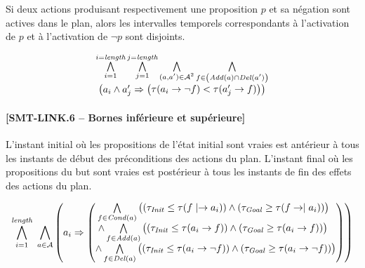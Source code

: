 Si deux actions produisant respectivement une proposition $p$ et sa négation sont actives dans le plan, alors les intervalles temporels correspondants à l’activation de $p$ et à l’activation de $\neg p$ sont disjoints.

\[
\begin{matrix}
\BigforallTwo{i=1}{i=\length} \BigforallTwo{j=1}{j=\length} \Bigforall{(\a,\b)\in\A^{2}} \Bigforall{\f\in\left(\Add{\a}\cap\Del{\b}\right)}\\ \left( \a_{i} \wedge \b_{j} \Rightarrow \left( \begin{matrix} \tau(\a_{i}\rightarrow\neg\f) < \tau(\b_{j}\rightarrow\f)%
\end{matrix} \right) \right)
\end{matrix}
\]

\paragraph*{[SMT-LINK.6 -- Bornes inférieure et supérieure]}

L’instant initial où les propositions de l’état initial sont vraies est antérieur à tous les instants de début des préconditions des actions du plan. L’instant final où les propositions du but sont vraies est postérieur à tous les instants de fin des effets des actions du plan.

\begin{small}
\[
\BigforallTwo{i=1}{\length}~\Bigforall{\substack{\a\in \A}}%
\left(\a_{i} \Rightarrow \begin{pmatrix}\Bigforall{\substack{\f\in \cond{\a}}} \begin{pmatrix}\left(\tau_{\mathit{Init}} \leq \tau(\f\mid\rightarrow\a_{i}) \right)%
 \wedge \left(\tau_{\mathit{Goal}} \geq \tau(\f\rightarrow\mid\a_{i})\right) \end{pmatrix}\hfill\\
 \wedge \Bigforall{\substack{\f\in \add{\a}}} \begin{pmatrix}\left(\tau_{\mathit{Init}} \leq \tau(\a_{i}\rightarrow \f) \right)%
 \wedge \left(\tau_{\mathit{Goal}} \geq \tau(\a_{i}\rightarrow \f)\right) \end{pmatrix}\hfill\\
 \wedge \Bigforall{\substack{\f\in \del{\a}}} \begin{pmatrix}\left(\tau_{\mathit{Init}} \leq \tau(\a_{i}\rightarrow \neg \f) \right)%
 \wedge \left(\tau_{\mathit{Goal}} \geq \tau(\a_{i}\rightarrow \neg \f)\right) \end{pmatrix} \end{pmatrix}\right)
\]
\end{small}